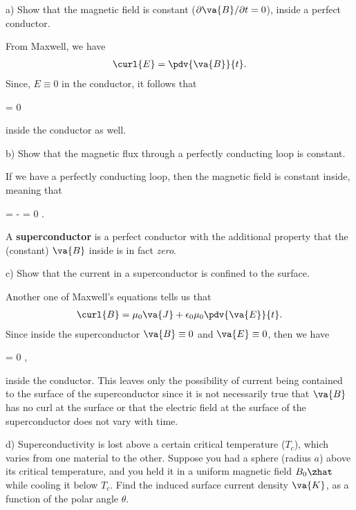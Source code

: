 \documentclass[12pt,a4paper]{article}
\begin{document}
a) Show that the magnetic field is constant ($\partial \va{B} / \partial t = 0$), inside a perfect conductor.

From Maxwell, we have
\begin{align*}
    \curl{E} = \pdv{\va{B}}{t}
.\end{align*}
Since, $E \equiv 0$ in the conductor, it follows that
\begin{eqbox}
     = 0
\end{eqbox}
inside the conductor as well.

b) Show that the magnetic flux through a perfectly conducting loop is constant.

If we have a perfectly conducting loop, then the magnetic field is constant inside, meaning that 
\begin{eqbox}
     = - = 0
.\end{eqbox}

A \textbf{superconductor} is a perfect conductor with the additional property that the (constant) $\va{B}$ inside is in fact \textit{zero}.

c) Show that the current in a superconductor is confined to the surface.

Another one of Maxwell's equations tells us that 
\begin{align*}
    \curl{B} = \mu_0 \va{J} + \epsilon_0 \mu_0 \pdv{\va{E}}{t}
.\end{align*}
Since inside the superconductor $\va{B} \equiv 0$ and $\va{E} \equiv 0$, then we have
\begin{eqbox}
     = 0
,\end{eqbox}
inside the conductor.
This leaves only the possibility of current being contained to the surface of the superconductor since it is not necessarily true that $\va{B}$ has no curl at the surface or that the electric field at the surface of the superconductor does not vary with time.

d) Superconductivity is lost above a certain critical temperature ($T_{c}$), which varies from one material to the other.
Suppose you had a sphere (radius $a$) above its critical temperature, and you held it in a uniform magnetic field $B_0 \zhat$ while cooling it below $T_{c}$.
Find the induced surface current density $\va{K}$, as a function of the polar angle $\theta$.
\end{document}
